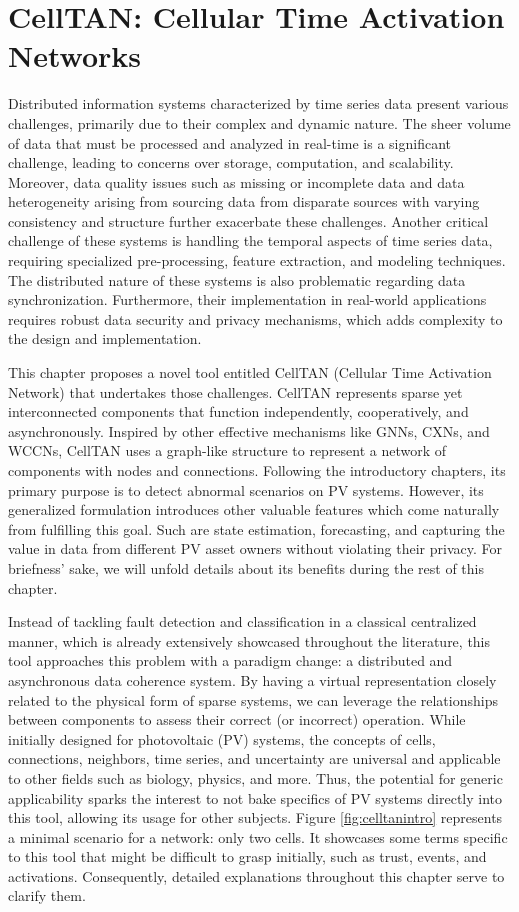 \chapter{CellTAN: Cellular Time Activation Networks} \label{chap:chap4}

Distributed information systems characterized by time series data present various challenges, primarily due to their complex and dynamic nature. The sheer volume of data that must be processed and analyzed in real-time is a significant challenge, leading to concerns over storage, computation, and scalability. Moreover, data quality issues such as missing or incomplete data and data heterogeneity arising from sourcing data from disparate sources with varying consistency and structure further exacerbate these challenges. Another critical challenge of these systems is handling the temporal aspects of time series data, requiring specialized pre-processing, feature extraction, and modeling techniques. The distributed nature of these systems is also problematic regarding data synchronization. Furthermore, their implementation in real-world applications requires robust data security and privacy mechanisms, which adds complexity to the design and implementation.

This chapter proposes a novel tool entitled CellTAN (Cellular Time Activation Network) that undertakes those challenges. CellTAN represents sparse yet interconnected components that function independently, cooperatively, and asynchronously. Inspired by other effective mechanisms like GNNs, CXNs, and WCCNs, CellTAN uses a graph-like structure to represent a network of components with nodes and connections. Following the introductory chapters, its primary purpose is to detect abnormal scenarios on PV systems. However, its generalized formulation introduces other valuable features which come naturally from fulfilling this goal. Such are state estimation, forecasting, and capturing the value in data from different PV asset owners without violating their privacy. For briefness' sake, we will unfold details about its benefits during the rest of this chapter.

Instead of tackling fault detection and classification in a classical centralized manner, which is already extensively showcased throughout the literature, this tool approaches this problem with a paradigm change: a distributed and asynchronous data coherence system. By having a virtual representation closely related to the physical form of sparse systems, we can leverage the relationships between components to assess their correct (or incorrect) operation. While initially designed for photovoltaic (PV) systems, the concepts of cells, connections, neighbors, time series, and uncertainty are universal and applicable to other fields such as biology, physics, and more. Thus, the potential for generic applicability sparks the interest to not bake specifics of PV systems directly into this tool, allowing its usage for other subjects. Figure \ref{fig:celltanintro} represents a minimal scenario for a network: only two cells. It showcases some terms specific to this tool that might be difficult to grasp initially, such as trust, events, and activations. Consequently, detailed explanations throughout this chapter serve to clarify them.

